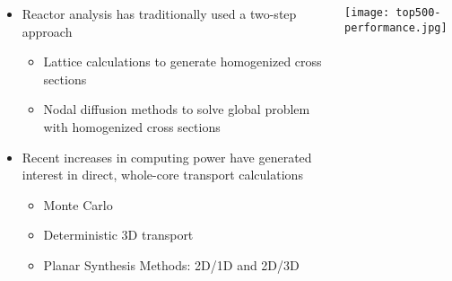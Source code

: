 \begin{frame}
    
\begin{columns}
    \begin{column}{0.5\textwidth}
        \begin{itemize}
            \item Reactor analysis has traditionally used a two-step approach
            \begin{itemize}
                \item Lattice calculations to generate homogenized cross sections
                \item Nodal diffusion methods to solve global problem with homogenized cross sections
            \end{itemize}
            \item Recent increases in computing power have generated interest in direct, whole-core transport calculations
            \begin{itemize}
                \item Monte Carlo
                \item Deterministic 3D transport
                \item Planar Synthesis Methods: 2D/1D and 2D/3D
            \end{itemize}
        \end{itemize}
    \end{column}
    \begin{column}{0.5\textwidth}
        \vfill
        \texttt{[image: top500-performance.jpg]}
        \vfill
    \end{column}
\end{columns}

\end{frame}


